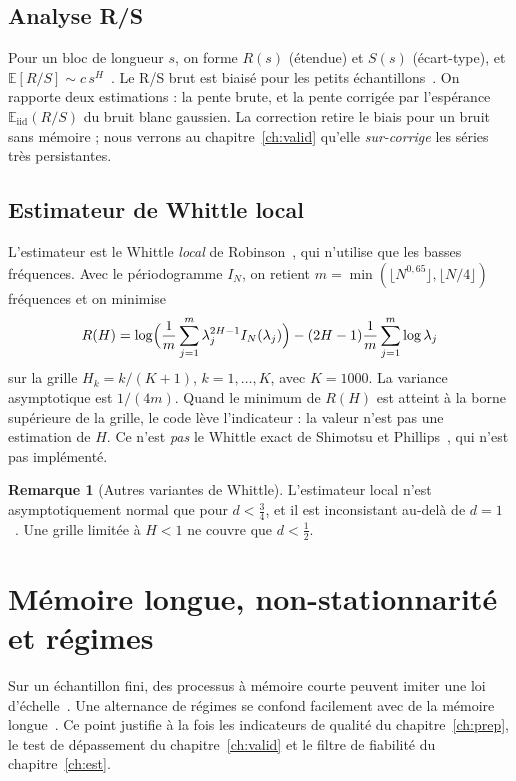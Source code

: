 \documentclass[12pt,a4paper]{report}
\theoremstyle{definition}
\newtheorem{remarque}{Remarque}[chapter]
\newcommand{\E}{\mathbb{E}}
\DeclareRobustCommand{\code}[1]{\texorpdfstring{\texttt{\detokenize{#1}}}{\detokenize{#1}}}
\begin{document}
\subsection{Analyse R/S}

Pour un bloc de longueur $s$, on forme $R(s)$ (étendue) et $S(s)$ (écart-type), et
$\E[R/S]\sim c\,s^{H}$~\cite{hurst1951,mandelbrot1969}. Le R/S brut est biaisé pour les
petits échantillons~\cite{anis1976,lo1991}. On rapporte deux estimations : la pente brute,
et la pente corrigée par l'espérance $\E_{\mathrm{iid}}(R/S)$ du bruit blanc gaussien.
La correction retire le biais pour un bruit sans mémoire ; nous verrons au
chapitre~\ref{ch:valid} qu'elle \emph{sur-corrige} les séries très persistantes.

\subsection{Estimateur de Whittle local}
\label{sec:whittle}

L'estimateur est le Whittle \emph{local} de Robinson~\cite{robinson1995}, qui n'utilise
que les basses fréquences. Avec le périodogramme $I_N$, on retient
$m=\min(\lfloor N^{0,65}\rfloor,\lfloor N/4\rfloor)$ fréquences et on minimise
\begin{equation}
  R(H)=\log\Bigl(\frac1m\sum_{j=1}^{m}\lambda_j^{2H-1}I_N(\lambda_j)\Bigr)
       -(2H-1)\frac1m\sum_{j=1}^{m}\log\lambda_j
  \label{eq:whittle}
\end{equation}
sur la grille $H_k=k/(K+1)$, $k=1,\dots,K$, avec $K=1000$. La variance asymptotique est
$1/(4m)$. Quand le minimum de $R(H)$ est atteint à la borne supérieure de la grille, le
code lève l'indicateur \code{whittle_a_la_borne} : la valeur n'est pas une estimation
de $H$. Ce n'est \emph{pas} le Whittle exact de Shimotsu et Phillips~\cite{shimotsu2005},
qui n'est pas implémenté.

\begin{remarque}[Autres variantes de Whittle]
L'estimateur local n'est asymptotiquement normal que pour $d<\tfrac34$, et il est
inconsistant au-delà de $d=1$~\cite{phillips2004}. Une grille limitée à $H<1$ ne couvre
que $d<\tfrac12$.
\end{remarque}

\section{Mémoire longue, non-stationnarité et régimes}

Sur un échantillon fini, des processus à mémoire courte peuvent imiter une loi
d'échelle~\cite{maraun2004}. Une alternance de régimes se confond facilement avec de la
mémoire longue~\cite{diebold2001}. Ce point justifie à la fois les indicateurs de qualité
du chapitre~\ref{ch:prep}, le test de dépassement du chapitre~\ref{ch:valid} et le filtre
de fiabilité du chapitre~\ref{ch:est}.
\end{document}
